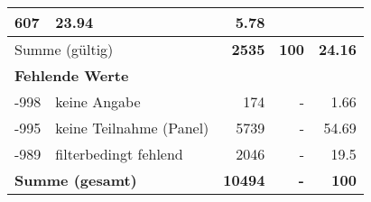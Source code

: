 \begin{longtable}{lXrrr}
       \num{607} &
       \num[round-mode=places,round-precision=2]{23,94} &
         \num[round-mode=places,round-precision=2]{5,78} \\
     \midrule
     \multicolumn{2}{l}{Summe (gültig)} &
       \textbf{\num{2535}} &
     \textbf{100} &
       \textbf{\num[round-mode=places,round-precision=2]{24,16}} \\
     \multicolumn{5}{l}{\textbf{Fehlende Werte}}\\
       -998 &
       keine Angabe &
         \num{174} &
        - &
         \num[round-mode=places,round-precision=2]{1,66} \\
       -995 &
       keine Teilnahme (Panel) &
         \num{5739} &
        - &
         \num[round-mode=places,round-precision=2]{54,69} \\
       -989 &
       filterbedingt fehlend &
         \num{2046} &
        - &
         \num[round-mode=places,round-precision=2]{19,5} \\
     \midrule
     \multicolumn{2}{l}{\textbf{Summe (gesamt)}} &
          \textbf{\num{10494}} &
        \textbf{-} &
        \textbf{100} \\
     \bottomrule
     \end{longtable}
     

